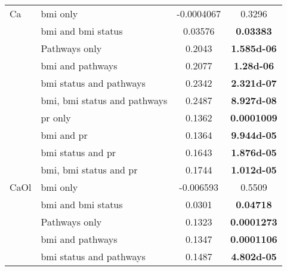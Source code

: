 \begin{ThreePartTable}
\begin{longtable}{llcc}
				\hline
				\rule{0pt}{2.25ex}Ca      & \gls{bmi} only                           & -0.0004067 & 0.3296                              \\
                                          & \gls{bmi} and \gls{bmi} status           & 0.03576    & \bfseries 0.03383                   \\
                                          & Pathways only                            & 0.2043     & \bfseries \num{1.585d-06}           \\
                                          & \gls{bmi} and pathways                   & 0.2077     & \bfseries \num{1.28d-06}            \\
                                          & \gls{bmi} status and pathways            & 0.2342     & \bfseries \num{2.321d-07}           \\
                                          & \gls{bmi}, \gls{bmi} status and pathways & 0.2487     & \bfseries \num{8.927d-08}           \\
                                          & \gls{pr} only                            & 0.1362     & \bfseries 0.0001009                 \\
                                          & \gls{bmi} and \gls{pr}                   & 0.1364     & \bfseries \num{9.944d-05}           \\
                                          & \gls{bmi} status and \gls{pr}            & 0.1643     & \bfseries \num{1.876d-05}           \\
                                          & \gls{bmi}, \gls{bmi} status and \gls{pr} & 0.1744     & \bfseries \num{1.012d-05}           \\
				\hline
				\rule{0pt}{2.25ex}CaOl    & \gls{bmi} only                           & -0.006593  & 0.5509                              \\
                                          & \gls{bmi} and \gls{bmi} status           & 0.0301     & \bfseries 0.04718                   \\
                                          & Pathways only                            & 0.1323     & \bfseries 0.0001273                 \\
                                          & \gls{bmi} and pathways                   & 0.1347     & \bfseries 0.0001106                 \\
                                          & \gls{bmi} status and pathways            & 0.1487     & \bfseries \num{4.802d-05}           \\

\end{longtable}
\end{ThreePartTable}
